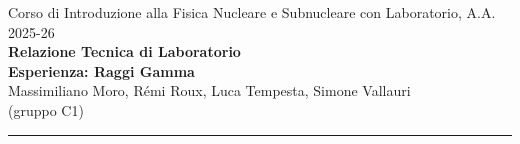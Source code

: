 \documentclass[a4paper,12pt]{article}
\begin{document}
\begin{center}

\small{Corso di Introduzione alla Fisica Nucleare e Subnucleare con Laboratorio, A.A. 2025-26} \\
\vspace{0.4cm}
\small{\textbf{Relazione Tecnica di Laboratorio}}\\
\vspace{0.4cm}
\LARGE{\textbf{Esperienza: Raggi Gamma}}
\vspace{0.4cm} \\
\normalsize{Massimiliano Moro, Rémi Roux, Luca Tempesta, Simone Vallauri} \\
\vspace{0.1cm}
\small (gruppo C1) \\

\vspace{0.1cm}
\medskip
\normalsize
\end{center}
\vspace{0.4cm}
{\color{gray}\hrule}
\medskip

\begin{abstract}
\noindent 
\end{abstract}

\tableofcontents
\clearpage

\pagestyle{fancy}
\fancyhead{} %











\clearpage

\appendix

\clearpage




\end{document}
